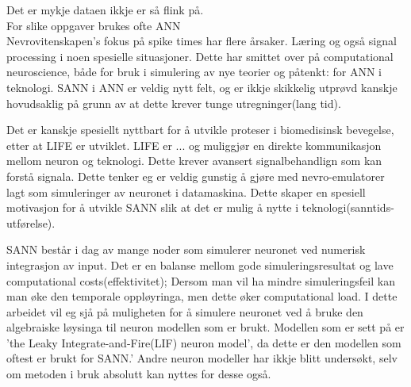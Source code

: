 	Det er mykje dataen ikkje er så flink på. \\
	For slike oppgaver brukes ofte ANN\\
	
	Nevrovitenskapen's fokus på spike times har flere årsaker. Læring og også signal processing i noen spesielle situasjoner.
	Dette har smittet over på computational neuroscience, både for bruk i simulering av nye teorier og påtenkt: for ANN i teknologi.
	SANN i ANN er veldig nytt felt, og er ikkje skikkelig utprøvd kanskje hovudsaklig på grunn av at dette krever tunge utregninger(lang tid).

	Det er kanskje spesiellt nyttbart for å utvikle proteser i biomedisinsk bevegelse, etter at LIFE er utviklet.
	LIFE er ...  og muliggjør en direkte kommunikasjon mellom neuron og teknologi. Dette krever avansert signalbehandlign som kan forstå signala.
	Dette tenker eg er veldig gunstig å gjøre med nevro-emulatorer lagt som simuleringer av neuronet i datamaskina.
	Dette skaper en spesiell motivasjon for å utvikle SANN slik at det er mulig å nytte i teknologi(sanntids-utførelse).

	SANN består i dag av mange noder som simulerer neuronet ved numerisk integrasjon av input.
	Det er en balanse mellom gode simuleringsresultat og lave computational costs(effektivitet); Dersom man vil ha mindre simuleringsfeil kan man øke den temporale oppløyringa, men dette øker computational load.
	I dette arbeidet vil eg sjå på muligheten for å simulere neuronet ved å bruke den algebraiske løysinga til neuron modellen som er brukt.
	Modellen som er sett på er 'the Leaky Integrate-and-Fire(LIF) neuron model', da dette er den modellen som oftest er brukt for SANN.'
	Andre neuron modeller har ikkje blitt undersøkt, selv om metoden i bruk absolutt kan nyttes for desse også.










